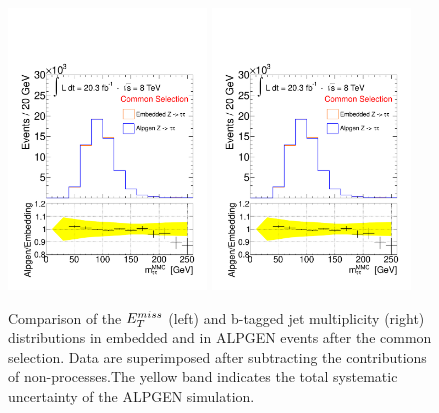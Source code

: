 \begin{figure}[tp]
     \begin{center}

           \includegraphics[page=2, width=0.47\textwidth]{figure/emb_plots.pdf}
            \includegraphics[page=3, width=0.47\textwidth]{figure/emb_plots.pdf}

    \end{center}
    \caption{Comparison of the  $E_{T}^{miss}$ (left)  and  b-tagged jet multiplicity (right) distributions in
	embedded and in ALPGEN \Ztautau events after the  common selection.
	Data are superimposed after subtracting  the contributions of non-\Ztautau processes.The yellow band indicates
	 the total systematic uncertainty  of the ALPGEN simulation.}
   \label{fig:emb_vs_alp}
\end{figure}

